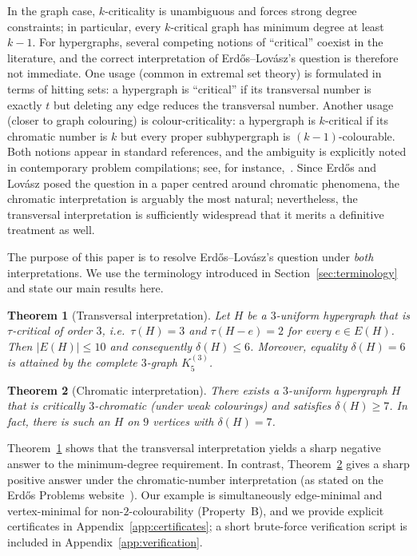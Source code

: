 \documentclass[11pt]{amsart}
\newtheorem{theorem}{Theorem}[section]
\theoremstyle{definition}
\theoremstyle{remark}
\newcommand{\E}{E}
\newcommand{\del}{\delta}
\begin{document}
In the graph case, $k$-criticality is unambiguous and forces strong degree constraints; in particular, every $k$-critical graph has minimum degree at least $k-1$.
For hypergraphs, several competing notions of ``critical'' coexist in the literature, and the correct interpretation of Erd\H{o}s--Lov\'asz's question is therefore not immediate.
One usage (common in extremal set theory) is formulated in terms of hitting sets: a hypergraph is ``critical'' if its transversal number is exactly $t$ but deleting any edge reduces the transversal number.
Another usage (closer to graph colouring) is colour-criticality: a hypergraph is $k$-critical if its chromatic number is $k$ but every proper subhypergraph is $(k-1)$-colourable.
Both notions appear in standard references, and the ambiguity is explicitly noted in contemporary problem compilations; see, for instance,~\cite{ErdosProblems834}.
Since Erd\H{o}s and Lov\'asz posed the question in a paper centred around chromatic phenomena, the chromatic interpretation is arguably the most natural; nevertheless, the transversal interpretation is sufficiently widespread that it merits a definitive treatment as well.

The purpose of this paper is to resolve Erd\H{o}s--Lov\'asz's question under \emph{both} interpretations.
We use the terminology introduced in Section~\ref{sec:terminology} and state our main results here.

\begin{theorem}[Transversal interpretation]\label{thm:intro-transversal}
Let $H$ be a $3$-uniform hypergraph that is \emph{$\tau$-critical of order $3$}, i.e.\ $\tau(H)=3$ and $\tau(H-e)=2$ for every $e\in \E(H)$.
Then $|\E(H)|\le 10$ and consequently $\del(H)\le 6$.
Moreover, equality $\del(H)=6$ is attained by the complete $3$-graph $K^{(3)}_5$.
\end{theorem}

\begin{theorem}[Chromatic interpretation]\label{thm:intro-chromatic}
There exists a $3$-uniform hypergraph $H$ that is \emph{critically $3$-chromatic} (under weak colourings) and satisfies $\del(H)\ge 7$.
In fact, there is such an $H$ on $9$ vertices with $\del(H)=7$.
\end{theorem}

Theorem~\ref{thm:intro-transversal} shows that the transversal interpretation yields a sharp negative answer to the minimum-degree requirement.
In contrast, Theorem~\ref{thm:intro-chromatic} gives a sharp positive answer under the chromatic-number interpretation (as stated on the Erd\H{o}s Problems website~\cite{ErdosProblems834}).
Our example is simultaneously edge-minimal and vertex-minimal for non-$2$-colourability (Property~B), and we provide explicit certificates in Appendix~\ref{app:certificates}; a short brute-force verification script is included in Appendix~\ref{app:verification}.
\end{document}
